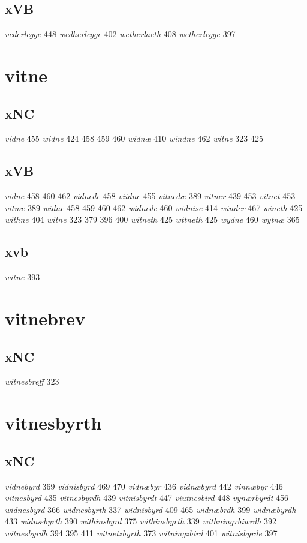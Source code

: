 \documentclass[a4paper,twocolumn]{article}
\begin{document}
\subsection{xVB}
\label{sec:orgb5eb8d6}
\emph{vederlegge} 448 \emph{wedherlegge} 402 \emph{wetherlacth} 408 \emph{wetherlegge} 397 
\section{vitne}
\label{sec:orga5707d7}
\subsection{xNC}
\label{sec:org24c9239}
\emph{vidne} 455 \emph{widne} 424 458 459 460 \emph{widnæ} 410 \emph{windne} 462 \emph{witne} 323 425 
\subsection{xVB}
\label{sec:orgc1bc684}
\emph{vidne} 458 460 462 \emph{vidnede} 458 \emph{viidne} 455 \emph{vitnedæ} 389 \emph{vitner} 439 453 \emph{vitnet} 453 \emph{vitnæ} 389 \emph{widne} 458 459 460 462 \emph{widnede} 460 \emph{widnise} 414 \emph{winder} 467 \emph{wineth} 425 \emph{withne} 404 \emph{witne} 323 379 396 400 \emph{witneth} 425 \emph{wttneth} 425 \emph{wydne} 460 \emph{wytnæ} 365 
\subsection{xvb}
\label{sec:org2966aeb}
\emph{witne} 393 
\section{vitnebrev}
\label{sec:org32cbb24}
\subsection{xNC}
\label{sec:org9f32094}
\emph{witnesbreff} 323 
\section{vitnesbyrth}
\label{sec:org15b59f1}
\subsection{xNC}
\label{sec:orga87787a}
\emph{vidnebyrd} 369 \emph{vidnisbyrd} 469 470 \emph{vidnæbyr} 436 \emph{vidnæbyrd} 442 \emph{vinnæbyr} 446 \emph{vitnesbyrd} 435 \emph{vitnesbyrdh} 439 \emph{vitnisbyrdt} 447 \emph{viutnesbird} 448 \emph{vynærbyrdt} 456 \emph{widnesbyrd} 366 \emph{widnesbyrth} 337 \emph{widnisbyrd} 409 465 \emph{widnæbrdh} 399 \emph{widnæbyrdh} 433 \emph{widnæbyrth} 390 \emph{withinsbyrd} 375 \emph{withinsbyrth} 339 \emph{withningxbiwrdh} 392 \emph{witnesbyrdh} 394 395 411 \emph{witnetzbyrth} 373 \emph{witningzbird} 401 \emph{witnisbyrde} 397 
\end{document}
